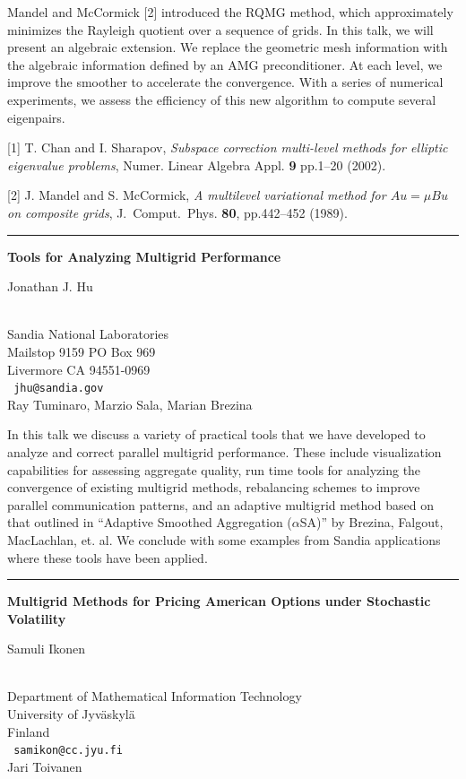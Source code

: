 \documentclass[twosided]{report}
\begin{document}
Mandel and McCormick [2] introduced the RQMG method, which
approximately minimizes the Rayleigh quotient over a sequence of grids.
In this talk, we will present an algebraic extension. We replace the
geometric mesh information with the algebraic information defined by an
AMG preconditioner. At each level, we improve the smoother to
accelerate the convergence. With a series of numerical experiments, we
assess the efficiency of this new algorithm to compute several
eigenpairs.

[1] T. Chan and I. Sharapov, {\em Subspace correction multi-level methods
for elliptic eigenvalue problems}, Numer. Linear Algebra Appl. {\bf 9}
pp.1--20 (2002).

[2] J. Mandel and S. McCormick,
{\em A multilevel variational method for $Au=\mu Bu$
on composite grids}, J.~Comput.~Phys. {\bf 80},
pp.442--452 (1989).

\begin{center}

\rule{6in}{1pt}
\end{center}

\begin{center}
{\large			\label{hu}
{\bf
Tools for Analyzing Multigrid Performance
}

Jonathan J. Hu} \\
Sandia National Laboratories \\
Mailstop 9159 PO Box 969 \\
Livermore CA 94551-0969
\\ {\tt
jhu@sandia.gov
}
\\
Ray Tuminaro,
Marzio Sala,
Marian Brezina
\end{center}

In this talk we discuss a variety of practical tools that we have
developed to analyze and correct parallel multigrid performance. These
include visualization capabilities for assessing aggregate quality, run
time tools for analyzing the convergence of existing multigrid methods,
rebalancing schemes to improve parallel communication patterns, and an
adaptive multigrid method based on that outlined in ``Adaptive Smoothed
Aggregation ($\alpha$SA)'' by Brezina, Falgout, MacLachlan, et. al. We
conclude with some examples from Sandia applications where these tools
have been applied.


\begin{center} \rule{6in}{1pt} \end{center}
\newpage	%


\begin{center}
{\large			\label{ikonen}
{\bf
Multigrid Methods for Pricing American Options under Stochastic
Volatility
}

Samuli Ikonen} \\
Department of Mathematical Information Technology \\
University of Jyv\"{a}skyl\"{a} \\
Finland
\\ {\tt
samikon@cc.jyu.fi
}
\\
Jari Toivanen
\end{center}
\end{document}
